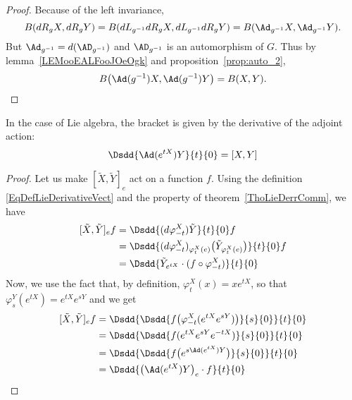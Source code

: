 \begin{proof}
Because of the left invariance,
\[
  B(dR_gX,dR_gY)=B(dL_{g^{-1}}dR_gX,dL_{g^{-1}}dR_gY)=B(\Ad_{g^{-1}}X,\Ad_{g^{-1}}Y).
\]
But $\Ad_{g^{-1}}=d(\AD_{g^{-1}})$ and $\AD_{g^{-1}}$ is an automorphism of $G$. Thus by lemma~\ref{LEMooEALFooJOeOgk} and proposition~\ref{prop:auto_2},
\begin{equation}                    \label{eq_KillAdinvariant}
B\big(\Ad(g^{-1})X,\Ad(g^{-1})Y\big)=B(X,Y).
\end{equation}
\end{proof}

\begin{lemma}
	In the case of Lie algebra, the bracket is given by the derivative of the adjoint action:
	\begin{equation}
		\Dsdd{ \Ad( e^{tX})Y }{t}{0}=[X,Y]
	\end{equation}
\end{lemma}

\begin{proof}
	Let us make $[\tilde X,\tilde Y]_e$ act on a function $f$. Using the definition \eqref{EqDefLieDerivativeVect} and the property of theorem~\ref{ThoLieDerrComm}, we have
	\begin{equation}
		\begin{aligned}[]
			[\tilde X,\tilde Y]_ef&=\Dsdd{ (d\varphi_{-t}^X)\tilde Y }{t}{0}f\\
			&=\Dsdd{ (d\varphi_{-t}^X)_{\varphi_t^X(e)}\big( \tilde Y_{\varphi_t^X(e)} \big) }{t}{0}f\\
			&=\Dsdd{ \tilde Y_{ e^{tX}}\cdot(f\circ\varphi_{-t}^X) }{t}{0}
		\end{aligned}
	\end{equation}
	Now, we use the fact that, by definition, $\varphi_t^X(x)=x e^{tX}$, so that $\varphi_s^Y( e^{tX})= e^{tX} e^{sY}$ and we get
	\begin{equation}
		\begin{aligned}[]
			[\tilde X,\tilde Y]_ef&=\Dsdd{ \Dsdd{ f\big( \varphi_{-t}^X( e^{tX} e^{sY}) \big) }{s}{0} }{t}{0}\\
			&=\Dsdd { \Dsdd{ f( e^{tX} e^{sY} e^{-tX}) }{s}{0} } {t}{0}\\
			&=\Dsdd{ \Dsdd{ f\big(  e^{s\Ad( e^{tX})Y} \big) }{s}{0} }{t}{0}\\
			&=\Dsdd{ \big( \Ad( e^{tX})Y \big)_e\cdot f }{t}{0}
		\end{aligned}
	\end{equation}

\end{proof}

